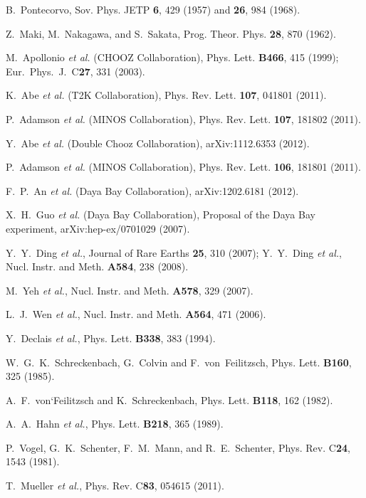 \documentclass[aps,prl,showpacs,showkeys,amsmath,amssymb,
twocolumn,
floatfix,
superscriptaddress
]{revtex4-1}
\begin{document}
\begin{thebibliography}{99}

 B.~Pontecorvo, Sov. Phys. JETP {\bf 6}, 429 (1957) and {\bf 26}, 984 (1968).

 Z.~Maki, M.~Nakagawa, and S.~Sakata, Prog. Theor. Phys. {\bf 28}, 870 (1962).

 M.~Apollonio {\it et al.}  (CHOOZ Collaboration), Phys. Lett. {\bf B466}, 415 (1999);
Eur.\ Phys.\ J.\ C{\bf 27}, 331 (2003).

 K.~Abe {\it et al.} (T2K Collaboration), Phys. Rev. Lett. {\bf 107}, 041801 (2011).

 P.~Adamson {\it et al.} (MINOS Collaboration), Phys. Rev. Lett. {\bf 107}, 181802 (2011).

 Y.~Abe {\it et al.} (Double Chooz Collaboration), arXiv:1112.6353 (2012).

 P.~Adamson {\it et al.} (MINOS Collaboration), Phys. Rev. Lett. {\bf 106}, 181801 (2011).

 F.~P.~An {\it et al.} (Daya Bay Collaboration), arXiv:1202.6181 (2012).

 X.~H.~Guo {\it et al.} (Daya Bay Collaboration), Proposal of the Daya Bay experiment, arXiv:hep-ex/0701029 (2007).

 Y.~Y.~Ding {\it et al.}, Journal of Rare Earths {\bf 25}, 310 (2007); Y.~Y.~Ding {\it et al.}, Nucl. Instr. and Meth. {\bf A584}, 238 (2008).

 M.~Yeh {\it et al.}, Nucl. Instr. and Meth. {\bf A578}, 329 (2007).

 L.~J.~Wen {\it et al.}, Nucl. Instr. and Meth. {\bf A564}, 471 (2006).

 Y.~Declais {\it et al.}, Phys. Lett. {\bf B338}, 383 (1994).

 W.~G.~K.~Schreckenbach, G.~Colvin and F.~von~Feilitzsch, Phys. Lett. {\bf B160}, 325 (1985).

 A.~F.~von`Feilitzsch and K.~Schreckenbach, Phys. Lett. {\bf B118}, 162 (1982).

 A.~A.~Hahn {\it et al.}, Phys. Lett. {\bf B218}, 365 (1989).

 P.~Vogel, G.~K.~Schenter, F.~M.~Mann, and R.~E.~Schenter, Phys. Rev. C{\bf 24}, 1543 (1981).

 T.~Mueller {\it et al.}, Phys. Rev. C{\bf 83}, 054615 (2011).


\end{thebibliography}
\end{document}
